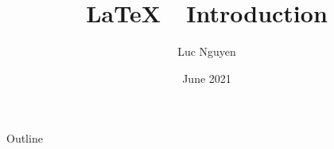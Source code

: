 \documentclass[handout]{beamer}
\title{\LaTeX\ \ Introduction}
\author{Luc Nguyen}
\date{June 2021}
\begin{document}
\maketitle

\begin{frame}{Outline}
    \tableofcontents
\end{frame}




% 
 


% 

\end{document}
